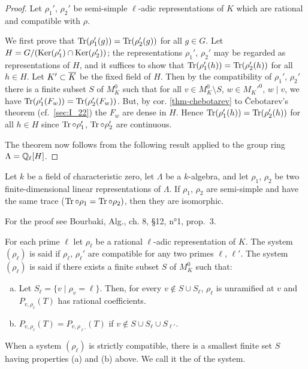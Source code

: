 \begin{proof}
Let $\rho_1'$, $\rho_2'$ be semi-simple $\ell$-adic representations of $K$ 
\dpage
which are rational and compatible with $\rho$.

We first prove that $\operatorname{Tr}(\rho_1'(g)) = \operatorname{Tr}(\rho_2'(g))$ for all $g \in G$. Let $H = G/(\operatorname{Ker}(\rho_1') \cap \operatorname{Ker}(\rho_2'))$; the representations $\rho_1'$, $\rho_2'$ may be regarded as representations of $H$, and it suffices to show that $\operatorname{Tr}(\rho_1'(h)) = \operatorname{Tr}(\rho_2'(h))$ for all $h \in H$. Let $K' \subset \overline{K}$ be the fixed field of $H$. Then by the compatibility of $\rho_1'$, $\rho_2'$ there is a finite subset $S$ of $M_K^0$ such that for all $v \in M_K^0 \setminus S$, $w \in M_K'^0$, $w \mid v$, we have $\operatorname{Tr}(\rho_1'(F_w)) = \operatorname{Tr}(\rho_2'(F_w))$. But, by cor. \ref{thm-chebotarev} to \v{C}ebotarev's theorem (cf.\ \ref{sec:I_22}) the $F_w$ are dense in $H$. Hence $\operatorname{Tr}(\rho_1'(h)) = \operatorname{Tr}(\rho_2'(h))$ for all $h \in H$ since $\operatorname{Tr} \circ \rho_1'$, $\operatorname{Tr} \circ \rho_2'$ are continuous.

The theorem now follows from the following result applied to the group ring $\Lambda = \mathbb{Q}_{\ell}[H]$.
\end{proof}

\begin{lem}
Let $k$ be a field of characteristic zero, let $\Lambda$ be a $k$-algebra, and let $\rho_1$, $\rho_2$ be two finite-dimensional linear representations of $\Lambda$. If $\rho_1$, $\rho_2$ are semi-simple and have the same trace ($\operatorname{Tr} \circ \rho_1 = \operatorname{Tr} \circ \rho_2)$, then they are isomorphic.
\end{lem}

For the proof see Bourbaki, Alg., ch. 8, \S12, n°1, prop.~3.

\begin{mydef}
For each prime $\ell$ let $\rho_\ell$ be a rational $\ell$-adic representation of $K$. The system $(\rho_\ell)$ is said  if $\rho_\ell$, $\rho_\ell'$ are compatible for any two primes $\ell$, $\ell'$. The system $(\rho_\ell)$ is said  if there exists a finite subset $S$ of $M_K^0$ such that:
\begin{enumerate}[(a)]
	\item Let $S_\ell = \{ v \mid \rho_v = \ell \}$. Then, for every $v \not\in S \cup S_\ell$, $\rho_\ell$ is unramified at $v$ and $P_{v,\rho_\ell}(T)$ has rational coefficients.
\item $P_{v,\rho_\ell}(T) = P_{v,\rho_{\ell'}}(T)$ if $v \not\in S \cup S_\ell \cup S_{\ell'}$.
\end{enumerate}
\end{mydef}
\dpage
When a system $(\rho_\ell)$ is strictly compatible, there is a smallest finite set $S$ having properties (a) and (b) above. We call it the  of the system.


